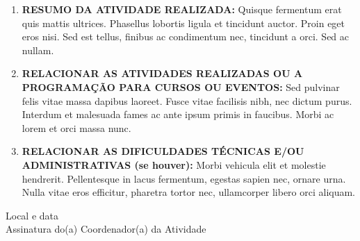 \documentclass[12pt,a4paper,oneside]{article}%
\begin{document}
\begin{enumerate}
\begin{enumerate}
\end{enumerate}%
\item%
\textbf{RESUMO DA ATIVIDADE REALIZADA: }%
Quisque fermentum erat quis mattis ultrices. Phasellus lobortis ligula et tincidunt auctor. Proin eget eros nisi. Sed est tellus, finibus ac condimentum nec, tincidunt a orci. Sed ac nullam.%
\item%
\textbf{RELACIONAR AS ATIVIDADES REALIZADAS OU A PROGRAMAÇÃO PARA CURSOS OU EVENTOS: }%
Sed pulvinar felis vitae massa dapibus laoreet. Fusce vitae facilisis nibh, nec dictum purus. Interdum et malesuada fames ac ante ipsum primis in faucibus. Morbi ac lorem et orci massa nunc.%
\item%
\textbf{RELACIONAR AS DIFICULDADES TÉCNICAS E/OU ADMINISTRATIVAS (se houver): }%
Morbi vehicula elit et molestie hendrerit. Pellentesque in lacus fermentum, egestas sapien nec, ornare urna. Nulla vitae eros efficitur, pharetra tortor nec, ullamcorper libero orci aliquam.%
\end{enumerate}%
\raggedleft%
\bigskip%
\begin{minipage}{.5\textwidth}%
\begin{center}%
\hrulefill%
\newline%
\bigskip%
Local e data \\%
\hrulefill%
\newline%
\bigskip%
Assinatura do(a) Coordenador(a) da Atividade%
\end{center}%
\end{minipage}%
\end{document}
